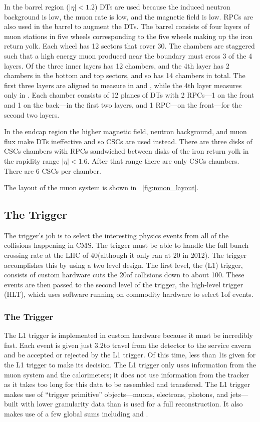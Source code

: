 In the barrel region ($|\eta| < 1.2$) DTs are used because the induced neutron
background is low, the muon rate is low, and the magnetic field is low. RPCs
are also used in the barrel to augment the DTs. The barrel consists of four
layers of muon stations in five wheels corresponding to the five wheels making
up the iron return yolk. Each wheel has 12 sectors that cover 30\degrees. The
chambers are staggered such that a high energy muon produced near the boundary
must cross 3 of the 4 layers. Of the three inner layers has 12 chambers, and
the 4th layer has 2 chambers in the bottom and top sectors, and so has 14
chambers in total. The first three layers are aligned to measure in \coordrphi
and \coordz, while the 4th layer measures only in \coordrphi. Each chamber
consists of 12 planes of DTs with 2 RPCs---1 on the front and 1 on the
back---in the first two layers, and 1 RPC---on the front---for the second two
layers.

In the endcap region the higher magnetic field, neutron background, and muon
flux make DTs ineffective and so CSCs are used instead. There are three disks
of CSCs chambers with RPCs sandwiched between disks of the iron return yolk in
the rapidity range $|\eta| < 1.6$. After that range there are only CSCs
chambers. There are 6 CSCs per chamber.

The layout of the muon system is shown in \FIG~\ref{fig:muon_layout}.

\subsection{The Trigger}

The trigger's job is to select the interesting physics events from all of the
collisions happening in CMS. The trigger must be able to handle the full bunch
crossing rate at the LHC of 40\megahertz (although it only ran at 20\megahertz
in 2012). The trigger accomplishes this by using a two level design. The first
level, the \Lone (L1) trigger, consists of custom hardware cuts the
20\megahertz of collisions down to about 100\kilohertz. These events are then
passed to the second level of the trigger, the high-level trigger (HLT), which
uses software running on commodity hardware to select 1\kilohertz of events.

\subsubsection{The \Lone Trigger}

The L1 trigger is implemented in custom hardware because it must be incredibly
fast. Each event is given just 3.2\microseconds to travel from the detector to
the service cavern and be accepted or rejected by the L1 trigger. Of this time,
less than 1\microseconds is given for the L1 trigger to make its decision. The
L1 trigger only uses information from the muon system and the calorimeters; it
does not use information from the tracker as it takes too long for this
data to be assembled and transfered. The L1 trigger makes use of ``trigger
primitive'' objects---muons, electrons, photons, and jets---built with lower
granularity data than is used for a full reconstruction. It also makes use of a
few global sums including \ET and \MET.

